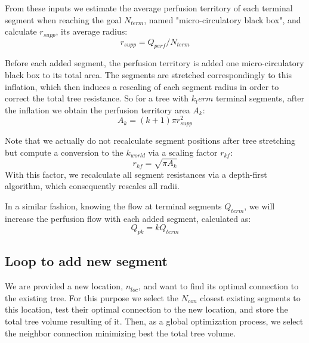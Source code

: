 \documentclass[a4paper, 11pt]{article} %
\begin{document}
From these inputs we estimate the average perfusion territory of each terminal segment when reaching the goal $N_{term}$, named "micro-circulatory black box", and calculate $r_{supp}$, its average radius:
\begin{equation}
r_{supp} = Q_{perf} / N_{term}
\end{equation}  

Before each added segment, the perfusion territory is added one micro-circulatory black box to its total area. The segments are stretched correspondingly to this inflation, which then induces a rescaling of each segment radius in order to correct the total tree resistance.  So for a tree with $k_term$ terminal segments, after the inflation we obtain the perfusion territory area $A_k$:
\begin{equation}
A_k = (k + 1) \pi r_{supp}^2
\end{equation}

Note that we actually do not recalculate segment positions after tree stretching but compute a conversion to the $k_{world}$ via a scaling factor $r_{kf}$:
\begin{equation}
r_{kf} = \sqrt{\pi A_k}
\end{equation}   
With this factor, we recalculate all segment resistances via a depth-first algorithm, which consequently rescales all radii.

In a similar fashion, knowing the flow at terminal segments $Q_{term}$, we will increase the perfusion flow with each added segment, calculated as:
\begin{equation}
Q_{pk} = k Q_{term}
\end{equation}  

\subsection{Loop to add new segment}
We are provided a new location, $n_{loc}$, and want to find its optimal connection to the existing tree. For this purpose we select the $N_{con}$ closest existing segments to this location, test their optimal connection to the new location, and store the total tree volume resulting of it. Then, as a global optimization process, we select the neighbor connection minimizing best the total tree volume.


\end{document}

